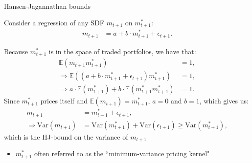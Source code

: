 \documentclass[xcolor=table, aspectratio=169]{beamer}
\newcommand{\E}{\mathbb{E}}
\begin{document}
\begin{frame}{Hansen-Jagannathan bounds}

Consider a regression of any SDF $m_{t+1}$ on $m_{t+1}^*$:
\begin{align*}
m_{t+1} &= a + b \cdot m_{t+1}^* + \epsilon_{t+1}.
\end{align*}

Because $m_{t+1}^*$ is in the space of traded portfolios, we have that:
\begin{align*}
    \E(m_{t+1} m_{t+1}^*) &= 1, \\ 
    \Rightarrow \E( (a + b \cdot m_{t+1}^* + \epsilon_{t+1}) m_{t+1}^* ) &= 1, \\
    \Rightarrow a \cdot \E( m_{t+1}^* ) + b \cdot \E( m_{t+1}^* m_{t+1}^* ) &= 1.
\end{align*}
Since $m_{t+1}^*$ prices itself and $\E(m_{t+1}) = m_{t+1}^*$, $a=0$ and $b=1$, which gives us:
\begin{align*}
m_{t+1} &= m_{t+1}^* + \epsilon_{t+1}, \\
\Rightarrow \text{Var}(m_{t+1}) &= \text{Var}(m_{t+1}^*) + \text{Var}(\epsilon_{t+1}) \geq \text{Var}(m_{t+1}^*),
\end{align*}
which is the HJ-bound on the variance of $m_{t+1}$
\begin{itemize}
     \item $m^*_{t+1}$ often referred to as the ``minimum-variance pricing kernel"
\end{itemize}

\end{frame}


\begin{comment}
\begin{frame}{Hansen-Jagannathan bounds}

Remember that, for any portfolio in $X_{t+1}$, we have:
\begin{align*}
\frac{\vert \mathbb{E}(R_{x,t+1}) - R_f \vert}{\sigma(R_{x,t+1})} &\leq R_f \sigma(m_{t+1}^*) \\
R_{x,{t+1}} &\equiv \frac{x_T}{p_t(x_{t+1})}
\end{align*}
Combined with the HJ bound, we have
\begin{align*}
\frac{\vert \mathbb{E}(R_{x,t+1}) - R_f \vert}{\sigma(R_{x,t+1})} &\leq R_f \sigma(m_{t+1}) 
\end{align*}
For all portfolios $x$ and all stochastic discount factors $m_{t+1}$. 
\end{frame}
\end{comment}
\end{document}
